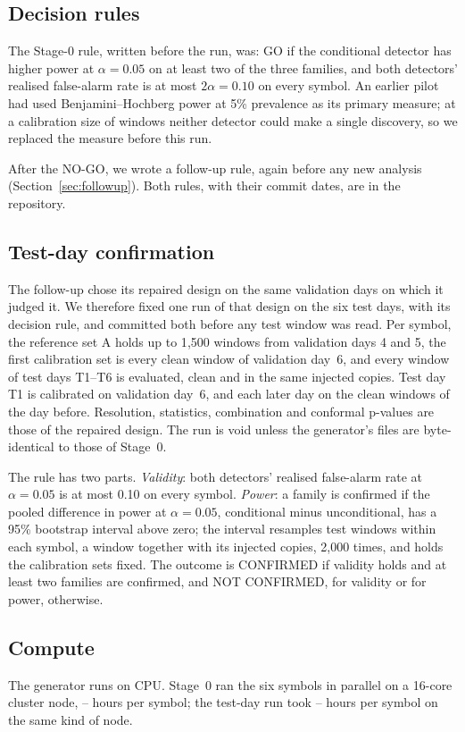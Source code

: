 \documentclass[journal]{IEEEtran}
\begin{document}
\subsection{Decision rules}
The Stage-0 rule, written before the run, was: GO if the conditional detector has higher power at $\alpha=0.05$
on at least two of the three families, and both detectors' realised false-alarm rate is at most $2\alpha=0.10$ on
every symbol. An earlier pilot had used Benjamini--Hochberg power at 5\% prevalence as its primary measure; at a
calibration size of \nCalFirstPilot{} windows neither detector could make a single discovery, so we replaced the measure
before this run.

After the NO-GO, we wrote a follow-up rule, again before any new analysis (Section~\ref{sec:followup}). Both
rules, with their commit dates, are in the repository.

\subsection{Test-day confirmation}
\label{sec:confdesign}
The follow-up chose its repaired design on the same validation days on which it judged it. We therefore fixed one
run of that design on the six test days, with its decision rule, and committed both before any test window was
read. Per symbol, the reference set A holds up to 1{,}500 windows from validation days 4 and 5, the first calibration set is every clean window of validation
day~6, and every window of test days T1--T6 is evaluated, clean and in the same \nVariants{} injected copies. Test
day T1 is calibrated on validation day~6, and each later day on the clean windows of the day before. Resolution,
statistics, combination and conformal p-values are those of the repaired design. The run is void unless the
generator's files are byte-identical to those of Stage~0.

The rule has two parts. \emph{Validity}: both detectors' realised false-alarm rate at $\alpha=0.05$ is at most
0.10 on every symbol. \emph{Power}: a family is confirmed if the pooled difference in power at $\alpha=0.05$,
conditional minus unconditional, has a 95\% bootstrap interval above zero; the interval resamples test windows
within each symbol, a window together with its injected copies, 2{,}000 times, and holds the calibration sets
fixed. The outcome is CONFIRMED if validity holds and at least two families are confirmed, and NOT CONFIRMED,
for validity or for power, otherwise.

\subsection{Compute}
The generator runs on CPU. Stage~0 ran the six symbols in parallel on a 16-core cluster node, \hoursLo--\hoursHi{}
hours per symbol; the test-day run took \confHoursLo--\confHoursHi{} hours per symbol on the same kind of node.
\end{document}
